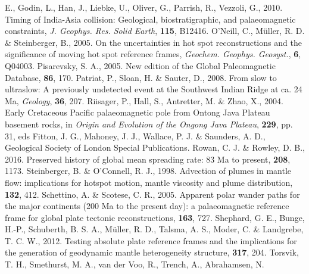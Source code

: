 \begin{thebibliography}{}
  E., Godin, L., Han, J., Liebke, U., Oliver, G., Parrish, R., Vezzoli, G.,
  2010. Timing of India-Asia collision: Geological, biostratigraphic, and
  palaeomagnetic constraints, \textit{J. Geophys. Res. Solid Earth},
  \textbf{115}, B12416.
  O'Neill, C., M{\"{u}}ller, R. D. \& Steinberger, B., 2005. On the
  uncertainties in hot spot reconstructions and the significance of moving hot
  spot reference frames, \textit{Geochem. Geophys. Geosyst.}, \textbf{6},
  Q04003.
  Pisarevsky, S. A., 2005. New edition of the Global Paleomagnetic Database,
  \eos{}\textbf{86}, 170.
  Patriat, P., Sloan, H. \& Sauter, D., 2008. From slow to ultraslow: A
  previously undetected event at the Southwest Indian Ridge at ca. 24 Ma,
  \textit{Geology}, \textbf{36}, 207.
  Riisager, P., Hall, S., Antretter, M. \& Zhao, X., 2004. Early Cretaceous
  Pacific palaeomagnetic pole from Ontong Java Plateau basement rocks, in
  \textit{Origin and Evolution of the Ongong Java Plateau}, \textbf{229}, pp.
  31, eds Fitton, J. G., Mahoney, J. J., Wallace, P. J. \&
  Saunders, A. D., Geological Society of London Special Publications.
  Rowan, C. J. \& Rowley, D. B., 2016. Preserved history of global mean
  spreading rate: 83 Ma to present, \gji{}\textbf{208}, 1173.
  Steinberger, B. \& O'Connell, R. J., 1998. Advection of plumes in mantle
  flow: implications for hotspot motion, mantle viscosity and plume
  distribution, \gji{}\textbf{132}, 412.
  Schettino, A. \& Scotese, C. R., 2005. Apparent polar wander paths for the
  major continents (200 Ma to the present day): a palaeomagnetic reference frame
  for global plate tectonic reconstructions, \gji{}\textbf{163},
  727.
  Shephard, G. E., Bunge, H.-P., Schuberth, B. S. A., M{\"{u}}ller, R. D.,
  Talsma, A. S., Moder, C. \& Landgrebe, T. C. W., 2012. Testing absolute plate
  reference frames and the implications for the generation of geodynamic mantle
  heterogeneity structure, \epsl{}\textbf{317}, 204.
  Torsvik, T. H., Smethurst, M. A., van der Voo, R., Trench, A., Abrahamsen, N.

\end{thebibliography}
